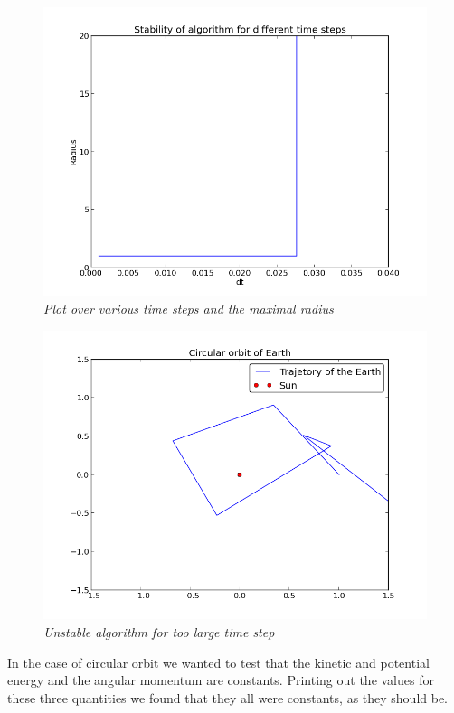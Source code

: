 \documentclass[a4paper,12pt, english]{article}
\begin{document}
\begin{figure}[h!]
  \centering
   	 \includegraphics[scale=0.5]{timestep_stability3.png}
  \caption{\textit{Plot over various time steps and the maximal radius}}
\end{figure}

\begin{figure}[h!]
  \centering
   	 \includegraphics[scale=0.5]{timesteps_stability2.png}
  \caption{\textit{Unstable algorithm for too large time step}}
\end{figure}


In the case of circular orbit we wanted to test that the kinetic and potential energy and the angular momentum are constants. Printing out the values for these three quantities we found that they all were constants, as they should be.
\end{document}
